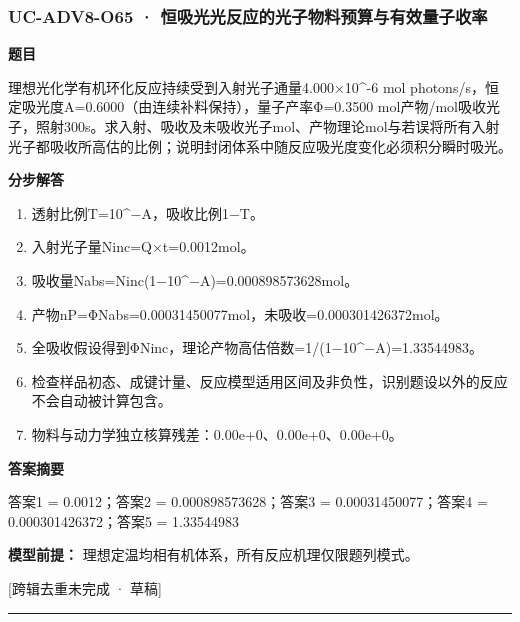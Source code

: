 \documentclass[UTF8,11pt,a4paper]{ctexart}
\begin{document}
\subsubsection*{UC-ADV8-O65 · 恒吸光光反应的光子物料预算与有效量子收率}
\noindent\textbf{题目}\par
理想光化学有机环化反应持续受到入射光子通量4.000×10\textasciicircum{}-6 mol photons/s，恒定吸光度A=0.6000（由连续补料保持），量子产率Φ=0.3500 mol产物/mol吸收光子，照射300s。求入射、吸收及未吸收光子mol、产物理论mol与若误将所有入射光子都吸收所高估的比例；说明封闭体系中随反应吸光度变化必须积分瞬时吸光。\par
\medskip\noindent\textbf{分步解答}
\begin{enumerate}
\item 透射比例T=10\textasciicircum{}−A，吸收比例1−T。
\item 入射光子量Ninc=Q×t=0.0012mol。
\item 吸收量Nabs=Ninc(1−10\textasciicircum{}−A)=0.000898573628mol。
\item 产物nP=ΦNabs=0.00031450077mol，未吸收=0.000301426372mol。
\item 全吸收假设得到ΦNinc，理论产物高估倍数=1/(1−10\textasciicircum{}−A)=1.33544983。
\item 检查样品初态、成键计量、反应模型适用区间及非负性，识别题设以外的反应不会自动被计算包含。
\item 物料与动力学独立核算残差：0.00e+0、0.00e+0、0.00e+0。
\end{enumerate}
\noindent\textbf{答案摘要}\par
答案1 = 0.0012；答案2 = 0.000898573628；答案3 = 0.00031450077；答案4 = 0.000301426372；答案5 = 1.33544983\par
\noindent\textbf{模型前提：}
理想定温均相有机体系，所有反应机理仅限题列模式。\par
\noindent\textcolor{red!65!black}{[跨辑去重未完成 · 草稿]} \par
\medskip\hrule\medskip
{}
\end{document}
